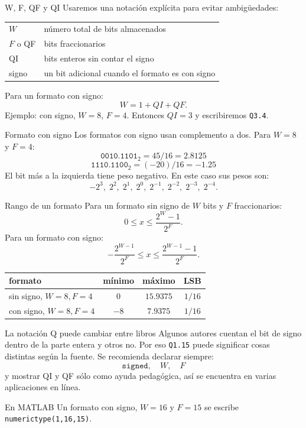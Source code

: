 \documentclass[aspectratio=169,10pt]{beamer}
\begin{document}
\begin{frame}{W, F, QF y QI}
  Usaremos una notación explícita para evitar ambigüedades:
  \begin{center}
  \begin{tabular}{ll}
    $W$ & número total de bits almacenados\\
    $F$ o QF & bits fraccionarios\\
    QI & bits enteros sin contar el signo\\
    signo & un bit adicional cuando el formato es con signo
  \end{tabular}
  \end{center}
  Para un formato con signo:
  \[
    W=1+QI+QF.
  \]
  Ejemplo: con signo, $W=8$, $F=4$. Entonces $QI=3$ y escribiremos
  \texttt{Q3.4}.
\end{frame}

\begin{frame}{Formato con signo}
  Los formatos con signo usan complemento a dos. Para $W=8$ y $F=4$:
  \[
    \texttt{0010.1101}_2=45/16=2.8125
  \]
  \[
    \texttt{1110.1100}_2=(-20)/16=-1.25
  \]
  El bit más a la izquierda tiene peso negativo. En este caso sus pesos son:
  \[
    -2^3,\;2^2,\;2^1,\;2^0,\;2^{-1},\;2^{-2},\;2^{-3},\;2^{-4}.
  \]
\end{frame}



\begin{frame}{Rango de un formato}
  Para un formato \alert{sin signo} de $W$ bits y $F$ fraccionarios:
  \[
    0 \leq x \leq \frac{2^W-1}{2^F}.
  \]
  Para un formato \alert{con signo}:
  \[
    -\frac{2^{W-1}}{2^F}\leq x\leq
    \frac{2^{W-1}-1}{2^F}.
  \]
  \begin{center}
  \begin{tabular}{lccc}
  \toprule
  formato & mínimo & máximo & LSB\\ \midrule
  sin signo, $W=8,F=4$ & $0$ & $15.9375$ & $1/16$\\
  con signo, $W=8,F=4$ & $-8$ & $7.9375$ & $1/16$\\
  \bottomrule
  \end{tabular}
  \end{center}
\end{frame}

\begin{frame}{La notación Q puede cambiar entre libros}
  Algunos autores cuentan el bit de signo dentro de la parte entera y otros no.
  Por eso \texttt{Q1.15} puede significar cosas distintas según la fuente.
  \vfill
  Se recomienda declarar siempre:
  \[
    \boxed{\texttt{signed},\quad W,\quad F}
  \]
  y mostrar QI y QF sólo como ayuda pedagógica, así se encuentra en varias aplicaciones en línea.
  \begin{exampleblock}{En MATLAB}
    Un formato con signo, $W=16$ y $F=15$ se escribe
    \texttt{numerictype(1,16,15)}.
  \end{exampleblock}
\end{frame}
\end{document}
